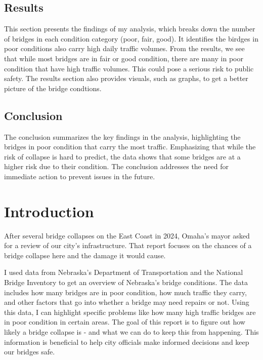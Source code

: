 \documentclass[
  letterpaper,
  DIV=11,
  numbers=noendperiod]{scrreprt}
\begin{document}
\section{Results}\label{results}

This section presents the findings of my analysis, which breaks down the
number of bridges in each condition category (poor, fair, good). It
identifies the birdges in poor conditions also carry high daily traffic
volumes. From the results, we see that while most bridges are in fair or
good condition, there are many in poor condition that have high traffic
volumes. This could pose a serious risk to public safety. The results
section also provides visuals, such as graphs, to get a better picture
of the bridge condtions.

\section{Conclusion}\label{conclusion}

The conclusion summarizes the key findings in the analysis, highlighting
the bridges in poor condition that carry the most traffic. Emphasizing
that while the risk of collapse is hard to predict, the data shows that
some bridges are at a higher risk due to their condition. The conclusion
addresses the need for immediate action to prevent issues in the future.


\chapter{Introduction}\label{introduction}

After several bridge collapses on the East Coast in 2024, Omaha's mayor
asked for a review of our city's infrastructure. That report focuses on
the chances of a bridge collapse here and the damage it would cause.

I used data from Nebraska's Department of Transportation and the
National Bridge Inventory to get an overview of Nebraska's bridge
conditions. The data includes how many bridges are in poor condition,
how much traffic they carry, and other factors that go into whether a
bridge may need repairs or not. Using this data, I can highlight
specific problems like how many high traffic bridges are in poor
condition in certain areas. The goal of this report is to figure out how
likely a bridge collapse is - and what we can do to keep this from
happening. This information is beneficial to help city officials make
informed decisions and keep our bridges safe.
\end{document}
